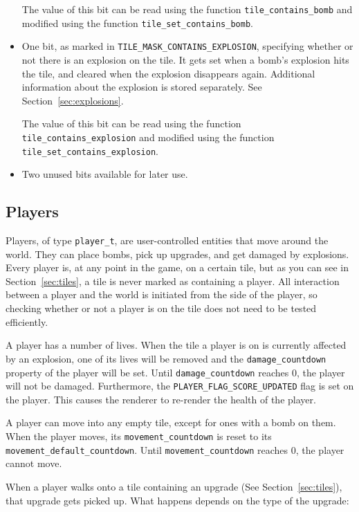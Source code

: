 \begin{itemize}
  The value of this bit can be read using the function
  \texttt{tile\_contains\_bomb} and modified using the function
  \texttt{tile\_set\_contains\_bomb}.

\item One bit, as marked in \texttt{TILE\_MASK\_CONTAINS\_EXPLOSION},
  specifying whether or not there is an explosion on the tile. It gets set when
  a bomb's explosion hits the tile, and cleared when the explosion disappears
  again. Additional information about the explosion is stored separately. See
  Section~\ref{sec:explosions}.

  The value of this bit can be read using the function
  \texttt{tile\_contains\_explosion} and modified using the function
  \texttt{tile\_set\_contains\_explosion}.

\item Two unused bits available for later use.
\end{itemize}

\subsection{Players}
\label{sec:players}

Players, of type \texttt{player\_t}, are user-controlled entities that move
around the world. They can place bombs, pick up upgrades, and get damaged by
explosions. Every player is, at any point in the game, on a certain tile, but
as you can see in Section~\ref{sec:tiles}, a tile is never marked as containing
a player. All interaction between a player and the world is initiated from the
side of the player, so checking whether or not a player is on the tile does not
need to be tested efficiently.

A player has a number of lives. When the tile a player is on is currently
affected by an explosion, one of its lives will be removed and the
\texttt{damage\_countdown} property of the player will be set. Until
\texttt{damage\_countdown} reaches 0, the player will not be damaged.
Furthermore, the \texttt{PLAYER\_FLAG\_SCORE\_UPDATED} flag is set on the
player. This causes the renderer to re-render the health of the player.

A player can move into any empty tile, except for ones with a bomb on them.
When the player moves, its \texttt{movement\_countdown} is reset to its
\texttt{movement\_default\_countdown}. Until
\texttt{movement\_countdown} reaches 0, the player cannot move.

When a player walks onto a tile containing an upgrade (See
Section~\ref{sec:tiles}), that upgrade gets picked up. What happens depends on
the type of the upgrade:

